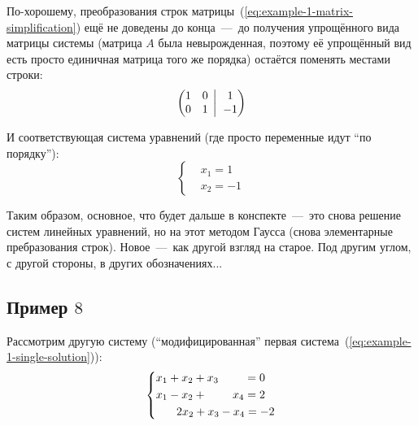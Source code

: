\documentclass[a4paper,12pt]{article}
\newcommand{\BigMiddleTwo}{\;\left|\vphantom{\begin{pmatrix} 0\\0 \end{pmatrix}}\right.\;}
\begin{document}
  По-хорошему, преобразования строк матрицы~(\ref{eq:example-1-matrix-simplification}) ещё не доведены до конца~---~до получения упрощённого вида матрицы системы (матрица $A$ была невырожденная, поэтому её упрощённый вид есть просто единичная матрица того же порядка) остаётся поменять местами строки:
  \[
    \left(
      \begin{matrix}
        1 & 0\\
        0 & 1
      \end{matrix}
      \BigMiddleTwo
      \begin{matrix}
        1\\
        -1
      \end{matrix}
    \right)
  \]

  И соответствующая система уравнений (где просто переменные идут ``по порядку''):
  \[
    \left\{
      \begin{aligned}
        &x_1 = 1\\
        &x_2 = -1
      \end{aligned}
    \right.
  \]

  Таким образом, основное, что будет дальше в конспекте~---~это снова решение систем линейных уравнений, но на этот методом Гаусса (снова элементарные пребразования строк).
  Новое~---~как другой взгляд на старое.
  Под другим углом, с другой стороны, в других обозначениях...


  
  \subsection{Пример $8$}  %

  Рассмотрим другую систему (``модифицированная'' первая система~(\ref{eq:example-1-single-solution})):
  \begin{equation}\label{eq:example-2-infty-solutions}
    \left\{ \begin{aligned}
      &x_1 + x_2 + x_3 \hphantom{{} + x_4} = 0\\
      &x_1 - x_2 + \hphantom{x_3 + {}} x_4 = 2\\
      &\hphantom{x_1 + } 2x_2 + x_3 - x_4 = -2
    \end{aligned} \right.
  \end{equation}
\end{document}
